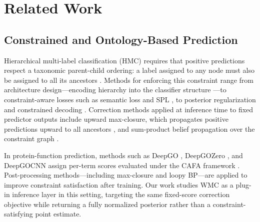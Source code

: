 
\section{Related Work}
\label{sec:related-work}


\subsection{Constrained and Ontology-Based Prediction}

Hierarchical multi-label classification (HMC) requires that positive
predictions respect a taxonomic parent-child ordering: a label assigned
to any node must also be assigned to all its ancestors
\citep{silla2011survey}. Methods for enforcing this constraint range
from architecture design---encoding hierarchy into the classifier
structure \citep{giunchiglia2020chmcnn}---to constraint-aware losses
such as semantic loss \citep{xu2018semanticloss} and SPL \citep{ahmed2022spl},
to posterior regularization \citep{ganchev2010posterior} and
constrained decoding \citep{diligenti2017semantic}.
Correction methods applied at inference time to fixed predictor outputs
include upward max-closure, which propagates positive predictions
upward to all ancestors \citep{obozinski2008consistent}, and
sum-product belief propagation over the constraint graph
\citep{giunchiglia2020chmcnn}.

In protein-function prediction, methods such as DeepGO
\citep{kulmanov2018deepgo}, DeepGOZero \citep{kulmanov2022deepgozero},
and DeepGOCNN \citep{kulmanov2020deepgoplus} assign per-term scores
evaluated under the CAFA framework \citep{radivojac2013cafa,zhou2019cafa3}.
Post-processing methods---including max-closure and loopy BP---are
applied to improve constraint satisfaction after training. Our work
studies WMC as a plug-in inference layer in this setting, targeting
the same fixed-score correction objective while returning a fully
normalized posterior rather than a constraint-satisfying point estimate.


